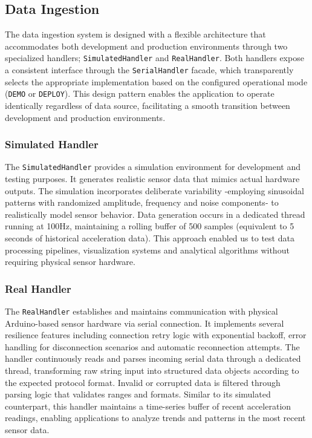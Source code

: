 \documentclass{article}
\begin{document}
\subsection{Data Ingestion}
The data ingestion system is designed with a flexible architecture that accommodates both development and production environments through two specialized handlers; \texttt{SimulatedHandler} and \texttt{RealHandler}. Both handlers expose a consistent interface through the \texttt{SerialHandler} facade, which transparently selects the appropriate implementation based on the configured operational mode (\texttt{DEMO} or \texttt{DEPLOY}). This design pattern enables the application to operate identically regardless of data source, facilitating a smooth transition between development and production environments.

    \subsubsection{Simulated Handler}
    The \texttt{SimulatedHandler} provides a simulation environment for development and testing purposes. It generates realistic sensor data that mimics actual hardware outputs. The simulation incorporates deliberate variability -employing sinusoidal patterns with randomized amplitude, frequency and noise components- to realistically model sensor behavior. Data generation occurs in a dedicated thread running at 100Hz, maintaining a rolling buffer of 500 samples (equivalent to 5 seconds of historical acceleration data). This approach enabled us to test data processing pipelines, visualization systems and analytical algorithms without requiring physical sensor hardware.
    
    \subsubsection{Real Handler}
    The \texttt{RealHandler} establishes and maintains communication with physical Arduino-based sensor hardware via serial connection. It implements several resilience features including connection retry logic with exponential backoff, error handling for disconnection scenarios and automatic reconnection attempts. The handler continuously reads and parses incoming serial data through a dedicated thread, transforming raw string input into structured data objects according to the expected protocol format. Invalid or corrupted data is filtered through parsing logic that validates ranges and formats. Similar to its simulated counterpart, this handler maintains a time-series buffer of recent acceleration readings, enabling applications to analyze trends and patterns in the most recent sensor data.
    
\end{document}
